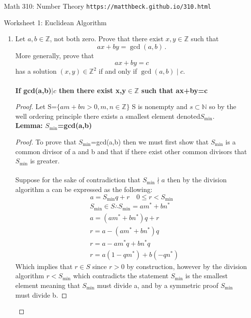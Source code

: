 \documentclass[11pt]{article}
\def\Z{\mathbb{Z}}
\def\N{\mathbb{N}}
\newcommand\setItemnumber[1]{\setcounter{enumi}{\numexpr#1-1\relax}}
\begin{document}
\setlength{\parindent}{0pt}
\setlength{\parskip}{0.2cm}

$\mbox{}$
\vspace{-1in}

{ Math 310: Number Theory} \hfill {\tt https://matthbeck.github.io/310.html}

\vspace{.1in}
\begin{center}
\Large{Worksheet 1: Euclidean Algorithm}
\end{center}

\begin{enumerate}
  \setItemnumber{7}
 \setItemnumber{7}
  \item Let $a, b \in \Z$, not both zero.
  Prove that there exist $x, y \in \Z$ such that
  \[
    ax+by = \gcd(a,b) \, .
  \]
  More generally, prove that
  \[
    ax+by = c
  \]
  has a solution $(x,y) \in \Z^2$ if and only if $\gcd(a,b) \mid c$.\\\\
  \textbf{ If gcd(a,b)$|c$ then there exist x,y$\in \Z$ such that ax+by=c}
    \begin{proof}
     Let S=$\{am+bn>0,m,n\in \Z\}$ S is nonempty and $s\subset \N$ so by the well ordering principle there exists a smallest element denoted$S_{\min}$.\\
     \textbf{Lemma: $S_{\min}$=gcd(a,b)}
     \begin{proof}
           To prove that $S_{\min}$=gcd(a,b) then we must first show that $S_{\min}$ is a common divisor of a and b and that if there exist other common divisors that $S_{\min}$ is greater. \\\\
           Suppose for the sake of contradiction that $S_{\min}\nmid a$ then by the division algorithm a can be expressed as the following:
           \[
             a=S_{\min}q+r\quad 0\leq r <S_{\min}
           \]
           \begin{align*}
             &S_{\min}\in S \therefore S_{\min}=am^*+bn^*\\
             &a=(am^*+bn^*)q+r\\
             &r=a-(am^*+bn^*)q\\
             &r=a-am^*q+bn^*q\\
             &r=a(1-qm^*)+b(-qn^*)
           \end{align*}
           Which implies that $r\in S$ since $r>0$ by construction, however by the division algorithm $r<S_{\min}$ which contradicts the statement $S_{\min}$ is the smallest element meaning that $S_{\min}$ must divide a, and by a symmetric proof $S_{\min}$ must divide b.

\end{proof}
\end{proof}
\end{enumerate}
\end{document}

